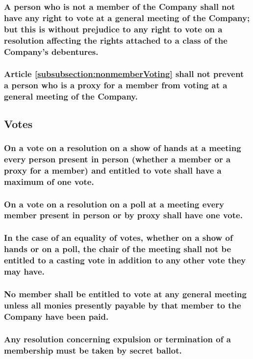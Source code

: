\documentclass[12pt]{article}
\begin{document}
\subsubsection{\label{subsubsection:nonmemberVoting}A person who is not a member of the Company shall not have any right to vote at a general meeting of the Company; but this is without prejudice to any right to vote on a resolution affecting the rights attached to a class of the Company’s debentures.}
\subsubsection{Article \ref{subsubsection:nonmemberVoting} shall not prevent a person who is a proxy for a member from voting at a general meeting of the Company.}

\subsection{Votes}
\subsubsection{On a vote on a resolution on a show of hands at a meeting every person present in person (whether a member or a proxy for a member) and entitled to vote shall have a maximum of one vote.}
\subsubsection{On a vote on a resolution on a poll at a meeting every member present in person or by proxy shall have one vote.}
\subsubsection{In the case of an equality of votes, whether on a show of hands or on a poll, the chair of the meeting shall not be entitled to a casting vote in addition to any other vote they may have.}
\subsubsection{No member shall be entitled to vote at any general meeting unless all monies presently payable by that member to the Company have been paid.}
\subsubsection{Any resolution concerning expulsion or termination of a membership must be taken by secret ballot.}
\end{document}
